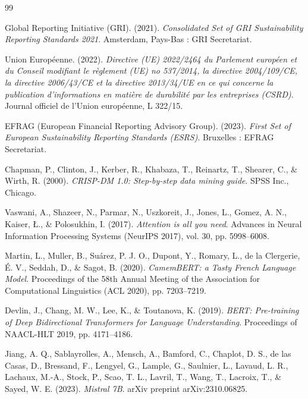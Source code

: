 \documentclass[12pt,a4paper]{report}
\begin{document}
\begin{thebibliography}{99}

Global Reporting Initiative (GRI). (2021).
\textit{Consolidated Set of GRI Sustainability Reporting Standards 2021}.
Amsterdam, Pays-Bas : GRI Secretariat.

Union Européenne. (2022).
\textit{Directive (UE) 2022/2464 du Parlement européen et du Conseil modifiant le règlement (UE) no 537/2014, la directive 2004/109/CE, la directive 2006/43/CE et la directive 2013/34/UE en ce qui concerne la publication d'informations en matière de durabilité par les entreprises (CSRD)}.
Journal officiel de l'Union européenne, L 322/15.

EFRAG (European Financial Reporting Advisory Group). (2023).
\textit{First Set of European Sustainability Reporting Standards (ESRS)}.
Bruxelles : EFRAG Secretariat.

Chapman, P., Clinton, J., Kerber, R., Khabaza, T., Reinartz, T., Shearer, C., \& Wirth, R. (2000).
\textit{CRISP-DM 1.0: Step-by-step data mining guide}.
SPSS Inc., Chicago.

Vaswani, A., Shazeer, N., Parmar, N., Uszkoreit, J., Jones, L., Gomez, A. N., Kaiser, Ł., \& Polosukhin, I. (2017).
\textit{Attention is all you need}.
Advances in Neural Information Processing Systems (NeurIPS 2017), vol. 30, pp. 5998--6008.

Martin, L., Muller, B., Suárez, P. J. O., Dupont, Y., Romary, L., de la Clergerie, É. V., Seddah, D., \& Sagot, B. (2020).
\textit{CamemBERT: a Tasty French Language Model}.
Proceedings of the 58th Annual Meeting of the Association for Computational Linguistics (ACL 2020), pp. 7203--7219.

Devlin, J., Chang, M. W., Lee, K., \& Toutanova, K. (2019).
\textit{BERT: Pre-training of Deep Bidirectional Transformers for Language Understanding}.
Proceedings of NAACL-HLT 2019, pp. 4171--4186.

Jiang, A. Q., Sablayrolles, A., Mensch, A., Bamford, C., Chaplot, D. S., de las Casas, D., Bressand, F., Lengyel, G., Lample, G., Saulnier, L., Lavaud, L. R., Lachaux, M.-A., Stock, P., Scao, T. L., Lavril, T., Wang, T., Lacroix, T., \& Sayed, W. E. (2023).
\textit{Mistral 7B}.
arXiv preprint arXiv:2310.06825.


\end{thebibliography}
\end{document}

